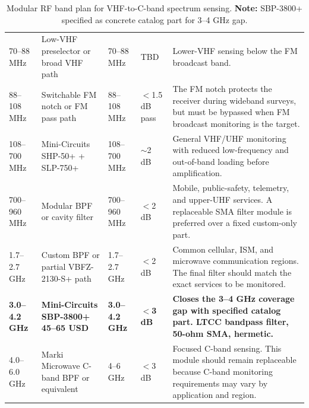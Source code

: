 \documentclass[11pt,a4paper]{article}
\newcommand{\blue}[1]{\textcolor{priceblue}{\textbf{#1}}}
\newcommand{\gc}{\textbullet}
\begin{document}
\begin{enumerate}[label=\roman*)]
\begin{table}[htbp]
\begin{tabular}{p{2.4cm}p{3.1cm}p{2.5cm}p{1.6cm}p{4.9cm}}
				70--88 MHz &
				Low-VHF preselector or broad VHF path &
				70--88 MHz &
				TBD &
				Lower-VHF sensing below the FM broadcast band. \\
				
				88--108 MHz &
				Switchable FM notch or FM pass path &
				88--108 MHz &
				$<$1.5 dB pass &
				The FM notch protects the receiver during wideband surveys, but must be
				bypassed when FM broadcast monitoring is the target. \\
				
				108--700 MHz &
				Mini-Circuits SHP-50+ + SLP-750+
				\href{https://www.minicircuits.com}{\gc} &
				108--700 MHz &
				$\sim$2 dB &
				General VHF/UHF monitoring with reduced low-frequency and out-of-band
				loading before amplification. \\
				
				700--960 MHz &
				Modular BPF or cavity filter &
				700--960 MHz &
				$<$2 dB &
				Mobile, public-safety, telemetry, and upper-UHF services. A replaceable
				SMA filter module is preferred over a fixed custom-only part. \\
				
				1.7--2.7 GHz &
				Custom BPF or partial VBFZ-2130-S+ path
				\href{https://www.minicircuits.com}{\gc} &
				1.7--2.7 GHz &
				$<$2 dB &
				Common cellular, ISM, and microwave communication regions. The final
				filter should match the exact services to be monitored. \\
				
				\textbf{3.0--4.2 GHz} &
				\textbf{Mini-Circuits SBP-3800+}
				\blue{45--65 USD} &
				\textbf{3.0--4.2 GHz} &
				\textbf{$<$3 dB} &
				\textbf{Closes the 3--4 GHz coverage gap with specified catalog part.
					LTCC bandpass filter, 50-ohm SMA, hermetic.} \\
				
				4.0--6.0 GHz &
				Marki Microwave C-band BPF or equivalent
				\href{https://shop.markimicrowave.com}{\gc} &
				4--6 GHz &
				$<$3 dB &
				Focused C-band sensing. This module should remain replaceable because
				C-band monitoring requirements may vary by application and region. \\
				
				\bottomrule
			\end{tabular}
			\caption{Modular RF band plan for VHF-to-C-band spectrum sensing.
				\textbf{Note:} SBP-3800+ specified as concrete catalog part for 3--4 GHz gap.}
			\label{tab:rf-band-plan}
		\end{table}
		

\end{enumerate}
\end{document}
